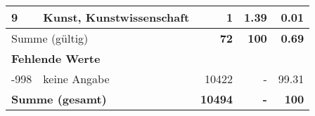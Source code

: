 \begin{longtable}{lXrrr}
     9 &
     \multicolumn{1}{X}{ Kunst, Kunstwissenschaft   } &


       \num{1} &
       \num[round-mode=places,round-precision=2]{1,39} &
         \num[round-mode=places,round-precision=2]{0,01} \\
     \midrule
     \multicolumn{2}{l}{Summe (gültig)} &
       \textbf{\num{72}} &
     \textbf{100} &
       \textbf{\num[round-mode=places,round-precision=2]{0,69}} \\
     \multicolumn{5}{l}{\textbf{Fehlende Werte}}\\
       -998 &
       keine Angabe &
         \num{10422} &
        - &
         \num[round-mode=places,round-precision=2]{99,31} \\
     \midrule
     \multicolumn{2}{l}{\textbf{Summe (gesamt)}} &
          \textbf{\num{10494}} &
        \textbf{-} &
        \textbf{100} \\
     \bottomrule
     \end{longtable}
     
